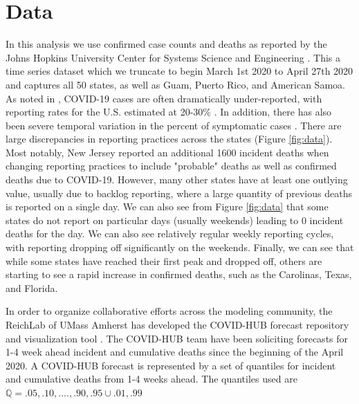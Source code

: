 \documentclass[11pt]{amsart}
\begin{document}
\section{Data}
	In this analysis we use confirmed case counts and deaths as reported by the Johns Hopkins University Center for Systems Science and Engineering \cite{dong2020interactive}. This a time series dataset which we truncate to begin March 1st 2020 to April 27th 2020 and captures all 50 states, as well as Guam, Puerto Rico, and American Samoa. As noted in \cite{krantz2020level}, COVID-19 cases are often dramatically under-reported, with reporting rates for the U.S. estimated at 20-30\% \cite{russel2020using}. In addition, there has also been severe temporal variation in the percent of symptomatic cases  \cite{russel2020using}. There are large discrepancies in reporting practices across the states (Figure \ref{fig:data}). Most notably, New Jersey reported an additional 1600 incident deaths when changing reporting practices to include "probable" deaths as well as confirmed deaths due to COVID-19. However, many other states have at least one outlying value, usually due to backlog reporting, where a large quantity of previous deaths is reported on a single day. We can also see from Figure \ref{fig:data} that some states do not report on particular days (usually weekends) leading to 0 incident deaths for the day.  We can also see relatively regular weekly reporting cycles, with reporting dropping off significantly on the weekends. Finally, we can see that while some states have reached their first peak and dropped off, others are starting to see a rapid increase in confirmed deaths, such as the Carolinas, Texas, and Florida. 
		
In order to organize collaborative efforts across the modeling community, the ReichLab of UMass Amherst has developed the COVID-HUB forecast repository and visualization tool \cite{covidhub}. The COVID-HUB team have been soliciting forecasts for 1-4 week ahead incident and cumulative deaths since the beginning of the April 2020. A COVID-HUB forecast is represented by a set of quantiles for incident and cumulative deaths from 1-4 weeks ahead. The quantiles used are $\mathbb{Q} = {.05,.10,....,.90,.95} \cup {.01,.99}$
\end{document}
